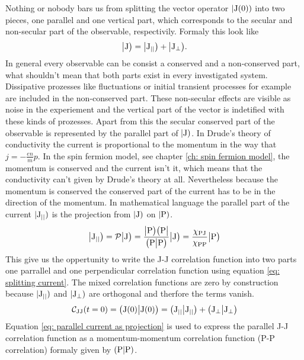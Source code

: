Nothing or nobody bars us from splitting the vector operator $|\mathrm{\mathrm{J}(0)})$ into two pieces, one parallel and one vertical part, which corresponds to the secular and non-secular part of the observable, respectivily.
Formaly this look like
%
\begin{align}
	\big|{\mathrm{J}}\big) = \big|{\mathrm{J}_{\mid\mid}}\big) + \big|{\mathrm{J}_{\bot}}\big).
	\label{eq: splitting current}
\end{align}
%
In general every observable can be consist a conserved and a non-conserved part, what shouldn't mean that both parts exist in every investigated system.
Dissipative prozesses like fluctuations or initial transient processes for example are included in the non-conserved part.
These non-secular effects are visible as noise in the experiement and the vertical part of the vector is indetified with these kinds of prozesses.
Apart from this the secular conserved part of the observable is represented by the parallel part of $|\mathrm{\mathrm{J}})$.
In Drude's theory of conductivity the current is proportional to the momentum in the way that $j = -\frac{en}{m}p$.
In the spin fermion model, see chapter \ref{ch: spin fermion model}, the momentum is conserved and the current isn't it, which means that the conductivity can't given by Drude's theory at all.
Nevertheless because the momentum is conserved the conserved part of the current has to be in the direction of the momentum.
In mathematical language the parallel part of the current $|\mathrm{\mathrm{J}_{\mid\mid}})$ is the projection from $|\mathrm{\mathrm{J}})$ on $|\mathrm{\mathrm{P}})$.
%
\begin{align}
	\big|{\mathrm{J}_{\mid\mid}}\big) = \mathcal{P}\big|{\mathrm{J}}\big) = \frac{\big|{\mathrm{P}}\big)\big({\mathrm{P}}\big|}{\big({\mathrm{P}}\big|{\mathrm{P}}\big)} \big|{\mathrm{J}}\big) = \frac{\chi_{\mathrm{PJ}}}{\chi_{\mathrm{PP}}} \big|{\mathrm{P}}\big)
	\label{eq: parallel current as projection}
\end{align}
%
This give us the oppertunity to write the J-J correlation function into two parts one parrallel and one perpendicular correlation function using equation \eqref{eq: splitting current}.
The mixed correlation functions are zero by construction because $|\mathrm{\mathrm{J}_{\mid\mid}})$ and $|\mathrm{\mathrm{J}_{\bot}})$ are orthogonal and therfore the terms vanish.
%
\begin{align}
	\mathcal{C}_{\mathrm{JJ}}(t=0) = \big({\mathrm{J}(0)}\big|{\mathrm{J}(0)}\big) = \big({\mathrm{J}_{\mid\mid}}\big|{\mathrm{J}_{\mid\mid}}\big) + \big({\mathrm{J}_{\bot}}\big|{\mathrm{J}_{\bot}}\big)
\end{align}
%
Equation \eqref{eq: parallel current as projection} is used to express the parallel J-J correlation function as a momentum-momentum correlation function (P-P correlation) formaly given by $({\mathrm{P}}|{\mathrm{P}})$.
